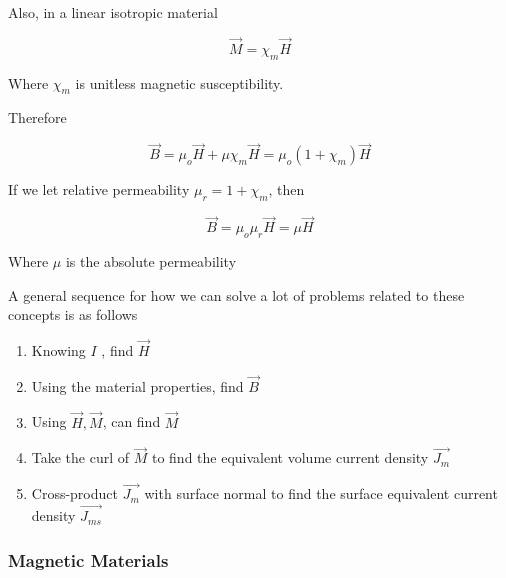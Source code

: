 \documentclass[10pt]{article}
\begin{document}
Also, in a linear isotropic material

\begin{equation}
	\vec{M} = \chi_m \vec{H}
\end{equation}


Where $ \chi_m $ is unitless magnetic susceptibility.


Therefore 

\begin{equation}
	\vec{B} = \mu_o \vec{H} + \mu \chi_m \vec{H} = \mu_o (1 + \chi_m) \vec{H} 
\end{equation}

If we let relative permeability $ \mu_r = 1 + \chi_m $, then 

\begin{equation}
	\vec{B} = \mu_o \mu_r \vec{H}= \mu \vec{H}
\end{equation}

Where $ \mu $ is the absolute permeability





A general sequence for how we can solve a lot of problems related to these concepts is as follows


\begin{enumerate}
	\item Knowing $ I $ , find $ \vec{H} $ 
	\item Using the material properties, find $ \vec{B} $ 
	\item Using $ \vec{H}, \vec{M} $, can find $ \vec{M} $ 
	\item Take the curl of $ \vec{M} $ to find the equivalent volume current density $ \vec{J_m} $ 
	\item Cross-product $ \vec{J_m} $ with surface normal to find the surface equivalent current density $ \vec{J_{ms}} $ 
\end{enumerate}


\subsubsection{Magnetic Materials}
\end{document}
